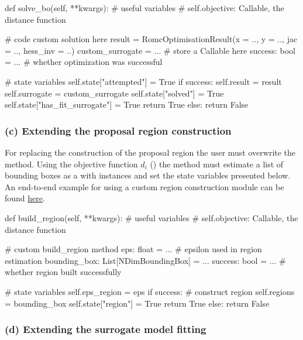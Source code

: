 \documentclass[article]{jss}
\begin{document}
\begin{Code}
def solve_bo(self, **kwargs):
    # useful variables
    # self.objective: Callable, the distance function

    # code custom solution here
    result = RomcOptimisationResult(x = .., y = .., jac = .., hess_inv = ..)
    custom_surrogate = ... # store a Callable here
    success: bool = ... # whether optimization was successful

    # state variables
    self.state["attempted"] = True
    if success:
        self.result = result
        self.surrogate = custom_surrogate
        self.state["solved"] = True
        self.state["has_fit_surrogate"] = True
        return True
    else:
        return False
\end{Code}

\subsubsection*{(c) Extending the proposal region construction}

For replacing the construction of the proposal region the user must
overwrite the  method. Using the objective function
\(d_i\) () the method must estimate a list of
bounding boxes as a  with  instances
and set the state variables presented below. An end-to-end example for
using a custom region construction module can be found
\href{https://colab.research.google.com/drive/1RzB-V1QueP1y1nyzv_VOqR1nVz3DUH3v?usp=sharing}{here}.

\begin{Code}
def build_region(self, **kwargs):
    # useful variables
    # self.objective: Callable, the distance function

    # custom build_region method
    eps: float = ... # epsilon used in region estimation
    bounding_box: List[NDimBoundingBox] = ...
    success: bool = ... # whether region built successfully

    # state variables
    self.eps_region = eps
    if success:
        # construct region
        self.regions = bounding_box
        self.state["region"] = True
        return True
    else:
        return False
\end{Code}

\subsubsection*{(d) Extending the surrogate model fitting}
\end{document}

